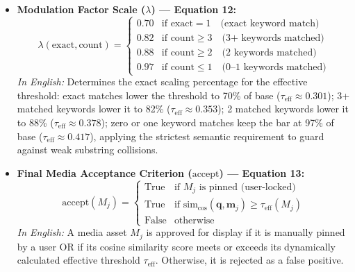 \documentclass{article}
\begin{document}
\begin{itemize}
    \item \textbf{Modulation Factor Scale ($\lambda$) --- Equation 12:}
    $$\lambda(\text{exact}, \text{count}) = \begin{cases} 
    0.70 & \text{if } \text{exact} = 1 \quad \text{(exact keyword match)} \\ 
    0.82 & \text{if } \text{count} \geq 3 \quad \text{(3+ keywords matched)} \\ 
    0.88 & \text{if } \text{count} \geq 2 \quad \text{(2 keywords matched)} \\ 
    0.97 & \text{if } \text{count} \leq 1 \quad \text{(0--1 keywords matched)} 
    \end{cases}$$
    \textit{In English:} Determines the exact scaling percentage for the effective threshold: exact matches lower the threshold to 70\% of base ($\tau_{\text{eff}} \approx 0.301$); 3+ matched keywords lower it to 82\% ($\tau_{\text{eff}} \approx 0.353$); 2 matched keywords lower it to 88\% ($\tau_{\text{eff}} \approx 0.378$); zero or one keyword matches keep the bar at 97\% of base ($\tau_{\text{eff}} \approx 0.417$), applying the strictest semantic requirement to guard against weak substring collisions.

    \item \textbf{Final Media Acceptance Criterion ($\text{accept}$) --- Equation 13:}
    $$\text{accept}(M_j) = \begin{cases} 
    \text{True} & \text{if } M_j \text{ is pinned (user-locked)} \\ 
    \text{True} & \text{if } \text{sim}_{\text{cos}}(\mathbf{q}, \mathbf{m}_j) \geq \tau_{\text{eff}}(M_j) \\ 
    \text{False} & \text{otherwise} 
    \end{cases}$$
    \textit{In English:} A media asset $M_j$ is approved for display if it is manually pinned by a user OR if its cosine similarity score meets or exceeds its dynamically calculated effective threshold $\tau_{\text{eff}}$. Otherwise, it is rejected as a false positive.
\end{itemize}
\end{document}
